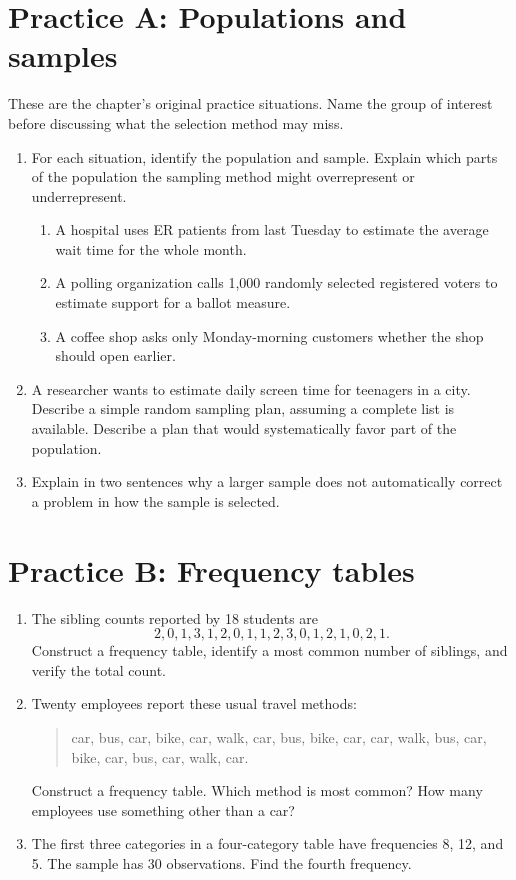 \clearpage
\section*{Practice A: Populations and samples}
These are the chapter's original practice situations. Name the group of interest before discussing what the selection method may miss.
\begin{enumerate}[label=A\arabic*.,leftmargin=2.5em,itemsep=10pt]
\item For each situation, identify the population and sample. Explain which parts of the population the sampling method might overrepresent or underrepresent.
\begin{enumerate}[label=(\alph*)]
\item A hospital uses ER patients from last Tuesday to estimate the average wait time for the whole month.
\item A polling organization calls 1,000 randomly selected registered voters to estimate support for a ballot measure.
\item A coffee shop asks only Monday-morning customers whether the shop should open earlier.
\end{enumerate}
\item A researcher wants to estimate daily screen time for teenagers in a city. Describe a simple random sampling plan, assuming a complete list is available. Describe a plan that would systematically favor part of the population.
\item Explain in two sentences why a larger sample does not automatically correct a problem in how the sample is selected.
\end{enumerate}

\section*{Practice B: Frequency tables}
\begin{enumerate}[label=B\arabic*.,leftmargin=2.5em,itemsep=10pt]
\item The sibling counts reported by 18 students are
\[2,0,1,3,1,2,0,1,1,2,3,0,1,2,1,0,2,1.\]
Construct a frequency table, identify a most common number of siblings, and verify the total count.
\item Twenty employees report these usual travel methods:
\begin{quote}car, bus, car, bike, car, walk, car, bus, bike, car, car, walk, bus, car, bike, car, bus, car, walk, car.\end{quote}
Construct a frequency table. Which method is most common? How many employees use something other than a car?
\item The first three categories in a four-category table have frequencies 8, 12, and 5. The sample has 30 observations. Find the fourth frequency.
\end{enumerate}

